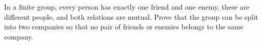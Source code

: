 In a finite group, every person has exactly one friend and one enemy, these are different people, and both relations are mutual. Prove that the group can be split into two companies so that no pair of friends or enemies belongs to the same company.
